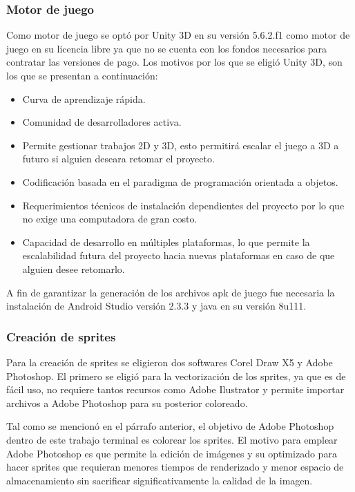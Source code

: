 		\subsubsection{Motor de juego}
	Como motor de juego se optó por Unity 3D en su versión 5.6.2.f1 como 
	motor de juego en su licencia libre ya que no se cuenta con los fondos necesarios 
	para contratar las versiones de pago. Los motivos por los que se eligió Unity 3D,
	 son los que se presentan a continuación:
	        \begin{itemize}
				\item Curva de aprendizaje rápida.
				\item Comunidad de desarrolladores activa.
				\item Permite gestionar trabajos 2D y 3D, esto permitirá escalar el
				 juego a 3D a futuro si alguien deseara retomar el proyecto.
				\item Codificación basada en el paradigma de programación orientada a
				objetos.
				\item Requerimientos técnicos de instalación dependientes del proyecto 
				por lo que no exige una computadora de gran costo.
				\item Capacidad de desarrollo en múltiples plataformas, lo que permite 
				la escalabilidad futura del proyecto hacia nuevas plataformas en caso de 
				que alguien desee retomarlo.
	        \end{itemize} 
	A fin de garantizar la generación de los archivos apk de juego fue necesaria la
	 instalación de Android Studio versión 2.3.3 y java en su versión  8u111.
		\subsubsection{Creación de sprites}
	Para la creación de sprites se eligieron dos softwares Corel Draw X5 y Adobe 
	Photoshop. El primero se eligió para la vectorización de los sprites, ya que es de 
	fácil uso, no requiere tantos recursos como Adobe Ilustrator y permite importar 
	archivos a Adobe Photoshop para su posterior coloreado.
	\\
	\par
	Tal como se mencionó en el párrafo anterior, el objetivo de Adobe Photoshop 
	dentro de este trabajo terminal es colorear los sprites. El motivo para emplear 
	Adobe Photoshop es que permite la edición de imágenes y su optimizado para hacer 
	sprites que requieran menores tiempos de renderizado y menor espacio de 
	almacenamiento sin sacrificar significativamente la calidad de la imagen.
